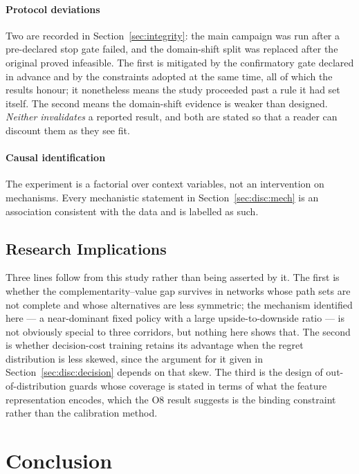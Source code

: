 \documentclass[preprint,12pt]{elsarticle}
\begin{document}
\paragraph{Protocol deviations} Two are recorded in Section~\ref{sec:integrity}:
the main campaign was run after a pre-declared stop gate failed, and the
domain-shift split was replaced after the original proved infeasible. The first is
mitigated by the confirmatory gate declared in advance and by the constraints
adopted at the same time, all of which the results honour; it nonetheless means
the study proceeded past a rule it had set itself. The second means the
domain-shift evidence is weaker than designed. \emph{Neither invalidates} a
reported result, and both are stated so that a reader can discount them as they
see fit.

\paragraph{Causal identification} The experiment is a factorial over context
variables, not an intervention on mechanisms. Every mechanistic statement in
Section~\ref{sec:disc:mech} is an association consistent with the data and is
labelled as such.

\subsection{Research Implications}
\label{sec:disc:research}

Three lines follow from this study rather than being asserted by it. The first is
whether the complementarity--value gap survives in networks whose path sets are
not complete and whose alternatives are less symmetric; the mechanism identified
here --- a near-dominant fixed policy with a large upside-to-downside ratio --- is
not obviously special to three corridors, but nothing here shows that. The second
is whether decision-cost training retains its advantage when the regret
distribution is less skewed, since the argument for it given in
Section~\ref{sec:disc:decision} depends on that skew. The third is the design of
out-of-distribution guards whose coverage is stated in terms of what the feature
representation encodes, which the O8 result suggests is the binding constraint
rather than the calibration method.

\section{Conclusion}
\label{sec:conclusion}
\end{document}

